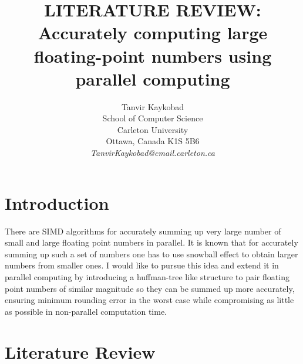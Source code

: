\documentclass[11pt]{article}       %
\begin{document}


\title{LITERATURE REVIEW: Accurately computing large floating-point numbers using parallel computing}


\author{
Tanvir Kaykobad\\
School of Computer Science\\
Carleton University\\
Ottawa, Canada K1S 5B6\\
{\em TanvirKaykobad@cmail.carleton.ca}
} %

\maketitle



\section{Introduction} \label{intro}

There are SIMD algorithms for accurately summing up very large number of small and large floating point numbers in parallel. It is known that for accurately summing up such a set of numbers one has to use snowball effect to obtain larger numbers from smaller ones. I would like to pursue this idea and extend it in parallel computing by introducing a huffman-tree like structure to pair floating point numbers of similar magnitude so they can be summed up more accurately, ensuring minimum rounding error in the worst case while compromising as little as possible in non-parallel computation time.

\section{Literature Review} \label{litrev}
\end{document}
